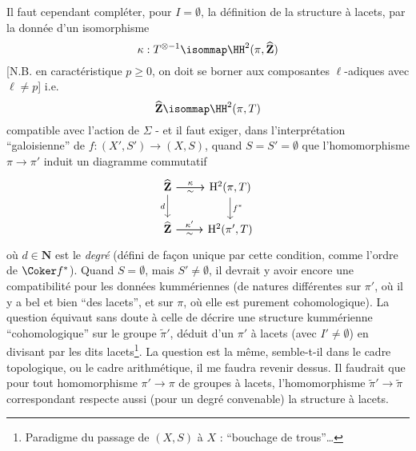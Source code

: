 Il faut cependant compléter, pour $I = \emptyset$, la définition de la structure à lacets, par la donnée d'un isomorphisme
$$
\kappa: T^{\otimes-1} \isommap \HH^2(\pi, \widehat{\mathbf{Z}})
$$
[N.B. en caractéristique $p \ge 0$, on doit se borner aux composantes $\ell$-adiques avec $\ell \neq p$] i.e.
$$
\widehat{\mathbf{Z}} \isommap \HH^2(\pi, T)
$$
compatible avec l'action de $\Sigma$ - et il faut exiger, dans l'interprétation ``galoisienne'' de $f: (X', S') \to (X, S)$, quand $S = S' = \emptyset$ que l'homomorphisme $\pi \to \pi'$ induit un diagramme commutatif
\[\begin{tikzcd}
	{\widehat{\mathbf{Z}}} & {\mathrm{H}^2(\pi, T)} \\
	{\widehat{\mathbf{Z}}} & {\mathrm{H}^2(\pi', T)}
	\arrow["{f^*}", from=1-2, to=2-2]
	\arrow["d"', from=1-1, to=2-1]
	\arrow["\sim"', from=1-1, to=1-2]
	\arrow["\kappa", from=1-1, to=1-2]
	\arrow["\sim"', from=2-1, to=2-2]
	\arrow["{\kappa'}", from=2-1, to=2-2]
\end{tikzcd}\]
où $d \in \mathbf{N}$ est le \emph{degré} (défini de fa\c{c}on unique par cette condition, comme l'ordre de $\Coker f^*$). Quand $S = \emptyset$, mais $S' \neq \emptyset$, il devrait y avoir encore une compatibilité pour les données kummériennes (de natures différentes sur $\pi'$, où il y a bel et bien ``des lacets'', et sur $\pi$, où elle est purement cohomologique). La question équivaut sans doute à celle de décrire une structure kummérienne ``cohomologique'' sur le groupe $\tilde{\pi}'$, déduit d'un $\pi'$ à lacets (avec $I' \neq \emptyset$) en divisant par les dits lacets\footnote{Paradigme du passage de $(X, S)$ à $X$ : ``bouchage de trous''\dots}. La question est la même, semble-t-il dans le cadre topologique, ou le cadre arithmétique, il me faudra revenir dessus. Il faudrait que pour tout homomorphisme $\pi' \to \pi$ de groupes à lacets, l'homomorphisme $\tilde{\pi}' \to \tilde{\pi}$ correspondant respecte aussi (pour un degré convenable) la structure à lacets. 

